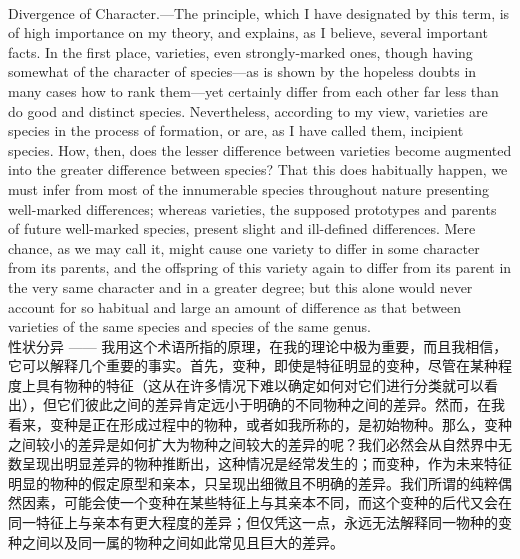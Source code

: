 \documentclass{article}
\begin{document}
\\
Divergence of Character.—The principle, which I have designated by this term, is of high importance on my theory, and explains, as I believe, several important facts. In the first place, varieties, even strongly-marked ones, though having somewhat of the character of species—as is shown by the hopeless doubts in many cases how to rank them—yet certainly differ from each other far less than do good and distinct species. Nevertheless, according to my view, varieties are species in the process of formation, or are, as I have called them, incipient species. How, then, does the lesser difference between varieties become augmented into the greater difference between species? That this does habitually happen, we must infer from most of the innumerable species throughout nature presenting well-marked differences; whereas varieties, the supposed prototypes and parents of future well-marked species, present slight and ill-defined differences. Mere chance, as we may call it, might cause one variety to differ in some character from its parents, and the offspring of this variety again to differ from its parent in the very same character and in a greater degree; but this alone would never account for so habitual and large an amount of difference as that between varieties of the same species and species of the same genus.\\
性状分异 —— 我用这个术语所指的原理，在我的理论中极为重要，而且我相信，它可以解释几个重要的事实。首先，变种，即使是特征明显的变种，尽管在某种程度上具有物种的特征（这从在许多情况下难以确定如何对它们进行分类就可以看出），但它们彼此之间的差异肯定远小于明确的不同物种之间的差异。然而，在我看来，变种是正在形成过程中的物种，或者如我所称的，是初始物种。那么，变种之间较小的差异是如何扩大为物种之间较大的差异的呢？我们必然会从自然界中无数呈现出明显差异的物种推断出，这种情况是经常发生的；而变种，作为未来特征明显的物种的假定原型和亲本，只呈现出细微且不明确的差异。我们所谓的纯粹偶然因素，可能会使一个变种在某些特征上与其亲本不同，而这个变种的后代又会在同一特征上与亲本有更大程度的差异；但仅凭这一点，永远无法解释同一物种的变种之间以及同一属的物种之间如此常见且巨大的差异。 
\end{document}
